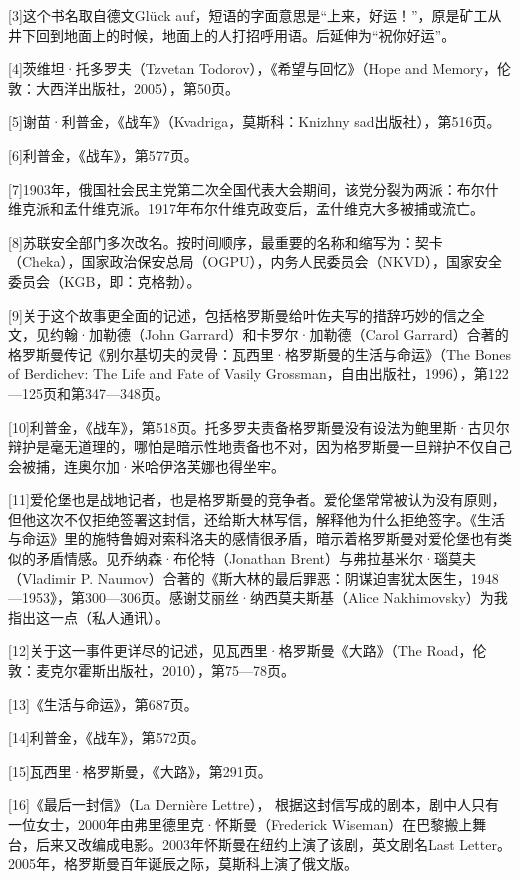 [3]这个书名取自德文Glück auf，短语的字面意思是“上来，好运！”，原是矿工从井下回到地面上的时候，地面上的人打招呼用语。后延伸为“祝你好运”。

[4]茨维坦·托多罗夫（Tzvetan Todorov），《希望与回忆》（Hope and Memory，伦敦：大西洋出版社，2005），第50页。

[5]谢苗·利普金，《战车》（Kvadriga，莫斯科：Knizhny sad出版社），第516页。

[6]利普金，《战车》，第577页。

[7]1903年，俄国社会民主党第二次全国代表大会期间，该党分裂为两派：布尔什维克派和孟什维克派。1917年布尔什维克政变后，孟什维克大多被捕或流亡。

[8]苏联安全部门多次改名。按时间顺序，最重要的名称和缩写为：契卡（Cheka），国家政治保安总局（OGPU），内务人民委员会（NKVD），国家安全委员会（KGB，即：克格勃）。

[9]关于这个故事更全面的记述，包括格罗斯曼给叶佐夫写的措辞巧妙的信之全文，见约翰·加勒德（John Garrard）和卡罗尔·加勒德（Carol Garrard）合著的格罗斯曼传记《别尔基切夫的灵骨：瓦西里·格罗斯曼的生活与命运》（The Bones of Berdichev: The Life and Fate of Vasily Grossman，自由出版社，1996），第122—125页和第347—348页。

[10]利普金，《战车》，第518页。托多罗夫责备格罗斯曼没有设法为鲍里斯·古贝尔辩护是毫无道理的，哪怕是暗示性地责备也不对，因为格罗斯曼一旦辩护不仅自己会被捕，连奥尔加·米哈伊洛芙娜也得坐牢。

[11]爱伦堡也是战地记者，也是格罗斯曼的竞争者。爱伦堡常常被认为没有原则，但他这次不仅拒绝签署这封信，还给斯大林写信，解释他为什么拒绝签字。《生活与命运》里的施特鲁姆对索科洛夫的感情很矛盾，暗示着格罗斯曼对爱伦堡也有类似的矛盾情感。见乔纳森·布伦特（Jonathan Brent）与弗拉基米尔·瑙莫夫（Vladimir P. Naumov）合著的《斯大林的最后罪恶：阴谋迫害犹太医生，1948—1953》，第300—306页。感谢艾丽丝·纳西莫夫斯基（Alice Nakhimovsky）为我指出这一点（私人通讯）。

[12]关于这一事件更详尽的记述，见瓦西里·格罗斯曼《大路》（The Road，伦敦：麦克尔霍斯出版社，2010），第75—78页。

[13]《生活与命运》，第687页。

[14]利普金，《战车》，第572页。

[15]瓦西里·格罗斯曼，《大路》，第291页。

[16]《最后一封信》（La Dernière Lettre）， 根据这封信写成的剧本，剧中人只有一位女士，2000年由弗里德里克·怀斯曼（Frederick Wiseman）在巴黎搬上舞台，后来又改编成电影。2003年怀斯曼在纽约上演了该剧，英文剧名Last Letter。2005年，格罗斯曼百年诞辰之际，莫斯科上演了俄文版。


